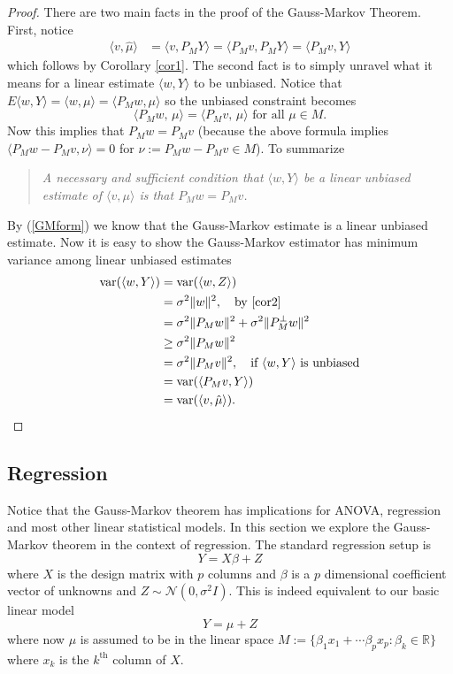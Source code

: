 \documentclass[11pt]{report}
\begin{document}
\begin{proof}
There are two main facts in the proof of the Gauss-Markov Theorem. First, notice 
\begin{align}
\langle v,\hat\mu\rangle &= \langle v,P_M Y \rangle =\langle P_Mv,P_M Y \rangle = \langle P_Mv,Y \rangle \label{GMform}
\end{align}
which follows by Corollary \ref{cor1}. 
The second fact is to simply unravel what it means for a linear estimate $\langle w,Y\rangle$  to be unbiased. Notice that $E\langle w,Y\rangle = \langle w, \mu\rangle= \langle P_M w, \mu\rangle$ so the unbiased constraint becomes
\begin{equation}
\langle P_Mw,\, \mu\rangle =  \langle P_M v,\, \mu\rangle\text{ for all $\mu\in M$}.
\end{equation} 
Now this implies that $P_Mw = P_Mv$ (because the above formula implies $\langle  P_Mw - P_Mv, \nu \rangle = 0$ for  $\nu := P_Mw - P_Mv\in M$). To summarize
\begin{quote}
\em
A necessary and sufficient condition that $\langle w, Y\rangle$ be a linear unbiased estimate of $\langle v, \mu\rangle$ is that $P_M w = P_M v$.
\end{quote}
By (\ref{GMform}) we know that the Gauss-Markov estimate is a linear unbiased estimate.
Now it is easy to show the Gauss-Markov estimator has minimum variance among linear unbiased estimates
\begin{align*}
\text{var}(\langle w, Y\rangle) &= \text{var}(\langle w, Z\rangle) \\
 &= \sigma^2\|w \|^2, \quad\text{by \ref{cor2}} \\
 &= \sigma^2\|P_Mw \|^2 + \sigma^2\|P_M^\perp w \|^2\\
 &\geq \sigma^2\|P_Mw \|^2 \\
 & = \sigma^2\|P_M v \|^2,\quad\text{if $\langle w, Y\rangle$ is unbiased} \\
 & = \text{var}(\langle P_M v, Y\rangle) \\
 & = \text{var}(\langle v, \hat\mu\rangle).
\end{align*}

\end{proof}


\subsection{Regression}
Notice that the Gauss-Markov theorem has implications for ANOVA, regression and most other linear statistical models. In this section we explore the Gauss-Markov theorem in the context of regression. The standard regression setup is 
\[
Y = X \beta + Z
\]
where $X$ is the design matrix with $p$ columns  and $\beta$ is a $p$ dimensional coefficient vector of unknowns and $Z\sim \mathcal N(0,\sigma^2 I)$. This is indeed equivalent to our basic linear model
\[Y = \mu + Z \]
where now $\mu$ is assumed to be in the linear space $M:= \{ \beta_1 x_1+\cdots \beta_p x_p:\beta_k\in \mathbb R\}$ where $x_k$ is the $k^\text{th}$ column of $X$. 
\end{document}
